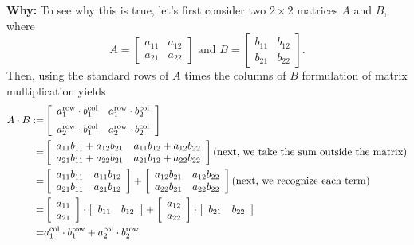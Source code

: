 \textbf{Why:} To see why this is true, let's first consider two $2 \times 2$ matrices $A$ and $B$, where
$$A= \left[\begin{array}{cc} a_{11}& a_{12} \\ a_{21} & a_{22}\end{array}\right]
\text{ and } B= \left[\begin{array}{cc} b_{11}& b_{12} \\ b_{21} & b_{22}\end{array}\right]
.$$
Then, using the standard rows of $A$ times the columns of $B$ formulation of matrix multiplication yields
$$
\begin{aligned}
 A \cdot B := &
\left[\begin{array}{cc}  a_1^{\rm row} \cdot b_1^{\rm col} & a_1^{\rm row} \cdot b_2^{\rm col}  \medskip  \\
a_2^{\rm row} \cdot b_1^{\rm col} & a_2^{\rm row} \cdot b_2^{\rm col}
\end{array}\right] \\ 
=& \left[\begin{array}{cc}  a_{11} b_{11} + a_{12}b_{21} & a_{11} b_{12} + a_{12}b_{22} \\
a_{21} b_{11} + a_{22}b_{21} & a_{21} b_{12} + a_{22}b_{22}
\end{array}\right]\bigskip  \text{(next, we take the sum outside the matrix)}\\
=& \left[\begin{array}{cc}  a_{11} b_{11}  & a_{11} b_{12} \\
a_{21} b_{11}  & a_{21} b_{12} 
\end{array}\right] + \left[\begin{array}{cc}  a_{12} b_{21}  & a_{12} b_{22} \\
a_{22} b_{21}  & a_{22} b_{22} 
\end{array}\right] \bigskip  \text{(next, we recognize each term)}\\
=& \left[\begin{array}{c} a_{11}\\ a_{21} \end{array}\right] \cdot 
 \left[\begin{array}{cc} b_{11}& b_{12} \end{array}\right] + 
 \left[\begin{array}{c} a_{12}\\ a_{22} \end{array}\right] \cdot 
 \left[\begin{array}{cc} b_{21}& b_{22} \end{array}\right]\\
=& a^{\rm col}_1 \cdot b^{\rm row}_1 + a^{\rm col}_2 \cdot b^{\rm row}_2
\end{aligned}
$$

